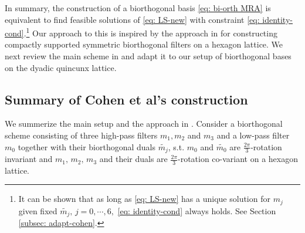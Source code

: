 In summary, the construction of a biorthogonal basis \eqref{eq: bi-orth MRA} is equivalent to find feasible solutions of \eqref{eq: LS-new} with constraint \eqref{eq: identity-cond}.\footnote{It can be shown that as long as \eqref{eq: LS-new} has a unique solution for $m_j$ given fixed $\widetilde{m_j}, \, j = 0,\cdots,6,$ \eqref{eq: identity-cond} always holds. See Section \ref{subsec: adapt-cohen}.}
Our approach to this is inspired by the approach in \cite{cohen1993compactly} for constructing compactly supported symmetric biorthogonal filters on a hexagon lattice. We next review the main scheme in \cite{cohen1993compactly} and adapt it to our setup of biorthogonal bases on the dyadic quincunx lattice.

\subsection{Summary of Cohen et al's construction}\label{subsec: cohen-summary}
We summerize the main setup and the approach in \cite{cohen1993compactly}. Consider a biorthogonal scheme consisting of three high-pass filters $m_1,m_2$ and $m_3$ and a low-pass filter $m_0$ together with their biorthogonal duals $\widetilde{m_j}$, s.t.
$m_0$ and $\widetilde{m_0}$ are $\frac{2\pi}{3}$-rotation invariant and $m_1,\, m_2,\, m_3$ and their duals are $\frac{2\pi}{3}$-rotation co-variant on a hexagon lattice.

